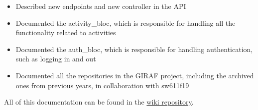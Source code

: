 \begin{itemize}
    \item Described new endpoints and new controller in the API
    \item Documented the activity\_bloc, which is responsible for handling all the functionality related to activities
    \item Documented the auth\_bloc, which is responsible for handling authentication, such as logging in and out
    \item Documented all the repositories in the GIRAF project, including the archived ones from previous years, in collaboration with sw611f19
\end{itemize}

All of this documentation can be found in the \href{https://github.com/aau-giraf/wiki}{wiki repository}.
